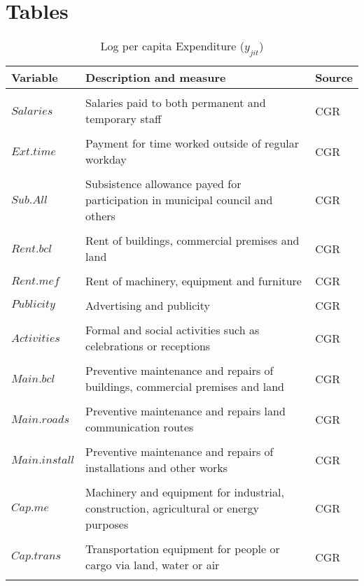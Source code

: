 \section*{Tables}

\begin{table}[ht]
\caption{Log per capita Expenditure ($y_{jit}$)}
\centering
\begin{adjustbox}{max width=\textwidth}
\begin{tabular}{l l l}
\hline\hline
Variable & Description and measure & Source \\ [0.5ex] 
\hline
\\
$Salaries$ & Salaries paid to both permanent and temporary staff & CGR\\
\\
$Ext.time$ & Payment for time worked outside of regular workday & CGR\\
\\
$Sub.All$ & Subsistence allowance payed for participation in municipal council and others & CGR\\
\\
$Rent.bcl$ & Rent of buildings, commercial premises and land & CGR\\
\\
$Rent.mef$ & Rent of machinery, equipment and furniture & CGR\\
\\
$Publicity$ & Advertising and publicity & CGR\\
\\
$Activities$ & Formal and social activities such as celebrations or receptions  & CGR\\
\\
$Main.bcl$ & Preventive maintenance and repairs of buildings, commercial premises and land  & CGR\\
\\
$Main.roads$ & Preventive maintenance and repairs land communication routes  & CGR\\
\\
$Main.install$ & Preventive maintenance and repairs of installations and other works & CGR\\
\\
$Cap.me$ & Machinery and equipment for industrial, construction, agricultural or energy purposes & CGR\\
\\
$Cap.trans$ & Transportation equipment for people or
cargo via land, water or air & CGR\\
\\

\end{tabular}
\end{adjustbox}
\end{table}
